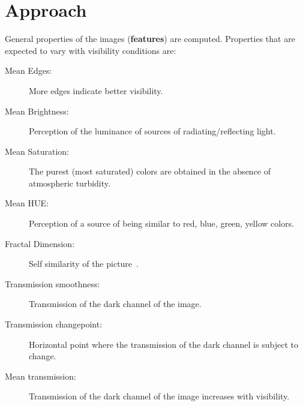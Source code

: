 \documentclass{article}
\begin{document}
\begin{minipage}[b]{\columnwidth}
\begin{minipage}[b]{0.4\columnwidth}
\begin{center}
	\label{figSensors}
	\end{center}
\end{minipage}
\end{minipage}

\section*{Approach}
General properties of the images (\textbf{features}) are computed. 
Properties that are expected to vary with visibility conditions are:

\begin{tcolorbox}[colback=red!5!white,colframe=red!75!black,title=Image Features]
\begin{description}
\item[Mean Edges:] More edges indicate better visibility.
\item[Mean Brightness:] Perception of the luminance of sources of radiating/reflecting light.
\item[Mean Saturation:] The purest (most saturated) colors are obtained in the absence of atmospheric turbidity.
\item[Mean HUE:] Perception of a source of being similar to red, blue, green, yellow colors.
\item[Fractal Dimension:] Self similarity of the picture~\cite{xion14}.
\item[Transmission smoothness:] Transmission of the dark channel of the image.
\item[Transmission changepoint:] Horizontal point where the transmission of the dark channel is subject to change.
\item[Mean transmission:] Transmission of the dark channel of the image increases with visibility.
\end{description}
\end{tcolorbox}
\end{document}

